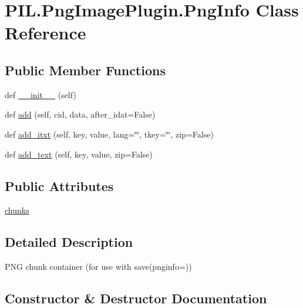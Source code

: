 \hypertarget{classPIL_1_1PngImagePlugin_1_1PngInfo}{}\section{P\+I\+L.\+Png\+Image\+Plugin.\+Png\+Info Class Reference}
\label{classPIL_1_1PngImagePlugin_1_1PngInfo}
\subsection*{Public Member Functions}
\begin{DoxyCompactItemize}
\item 
def \hyperlink{classPIL_1_1PngImagePlugin_1_1PngInfo_a24ecc8e9f503ebb8faf321fbe4b05132}{\+\_\+\+\_\+init\+\_\+\+\_\+} (self)
\item 
def \hyperlink{classPIL_1_1PngImagePlugin_1_1PngInfo_a5d41090193bc5aeda95950f47604f6f0}{add} (self, cid, data, after\+\_\+idat=False)
\item 
def \hyperlink{classPIL_1_1PngImagePlugin_1_1PngInfo_a724fac3ae7f458e8ad79e3e21139c1cd}{add\+\_\+itxt} (self, key, value, lang=\char`\"{}\char`\"{}, tkey=\char`\"{}\char`\"{}, zip=False)
\item 
def \hyperlink{classPIL_1_1PngImagePlugin_1_1PngInfo_ad123e11037f40a30c57da5a412cfa837}{add\+\_\+text} (self, key, value, zip=False)
\end{DoxyCompactItemize}
\subsection*{Public Attributes}
\begin{DoxyCompactItemize}
\item 
\hyperlink{classPIL_1_1PngImagePlugin_1_1PngInfo_a5ec9de6ad200880c6dfadc12333cfb54}{chunks}
\end{DoxyCompactItemize}


\subsection{Detailed Description}
\begin{DoxyVerb}PNG chunk container (for use with save(pnginfo=))\end{DoxyVerb}
 

\subsection{Constructor \& Destructor Documentation}
\mbox{\label{classPIL_1_1PngImagePlugin_1_1PngInfo_a24ecc8e9f503ebb8faf321fbe4b05132}} 
